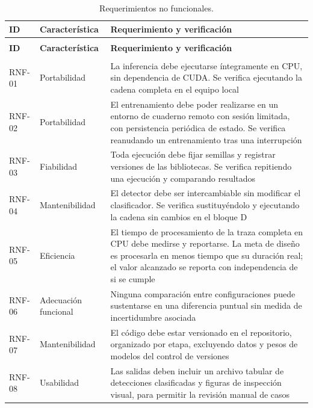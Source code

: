 {\small
\begin{longtable}{>{\raggedright\arraybackslash}p{1.4cm}>{\raggedright\arraybackslash}p{2.6cm}>{\raggedright\arraybackslash}p{7.4cm}}
\caption{Requerimientos no funcionales.}\label{tab:rnf}\\
\toprule
\textbf{ID} & \textbf{Característica} & \textbf{Requerimiento y verificación} \\
\midrule
\endfirsthead
\multicolumn{3}{l}{\itshape Cuadro \thetable{} (continuación)}\\
\toprule
\textbf{ID} & \textbf{Característica} & \textbf{Requerimiento y verificación} \\
\midrule
\endhead
\midrule
\multicolumn{3}{r}{\itshape Continúa en la página siguiente}\\
\endfoot
\bottomrule
\endlastfoot
RNF-01 & Portabilidad &
La inferencia debe ejecutarse íntegramente en CPU, sin dependencia de CUDA. Se
verifica ejecutando la cadena completa en el equipo local \\
\addlinespace
RNF-02 & Portabilidad &
El entrenamiento debe poder realizarse en un entorno de cuaderno remoto con sesión
limitada, con persistencia periódica de estado. Se verifica reanudando un
entrenamiento tras una interrupción \\
\addlinespace
RNF-03 & Fiabilidad &
Toda ejecución debe fijar semillas y registrar versiones de las bibliotecas. Se
verifica repitiendo una ejecución y comparando resultados \\
\addlinespace
RNF-04 & Mantenibilidad &
El detector debe ser intercambiable sin modificar el clasificador. Se verifica
sustituyéndolo y ejecutando la cadena sin cambios en el bloque D \\
\addlinespace
RNF-05 & Eficiencia &
El tiempo de procesamiento de la traza completa en CPU debe medirse y reportarse.
La meta de diseño es procesarla en menos tiempo que su duración real; el valor
alcanzado se reporta con independencia de si se cumple \\
\addlinespace
RNF-06 & Adecuación funcional &
Ninguna comparación entre configuraciones puede sustentarse en una diferencia
puntual sin medida de incertidumbre asociada \\
\addlinespace
RNF-07 & Mantenibilidad &
El código debe estar versionado en el repositorio, organizado por etapa,
excluyendo datos y pesos de modelos del control de versiones \\
\addlinespace
RNF-08 & Usabilidad &
Las salidas deben incluir un archivo tabular de detecciones clasificadas y figuras
de inspección visual, para permitir la revisión manual de casos \\
\bottomrule
\end{longtable}
}

